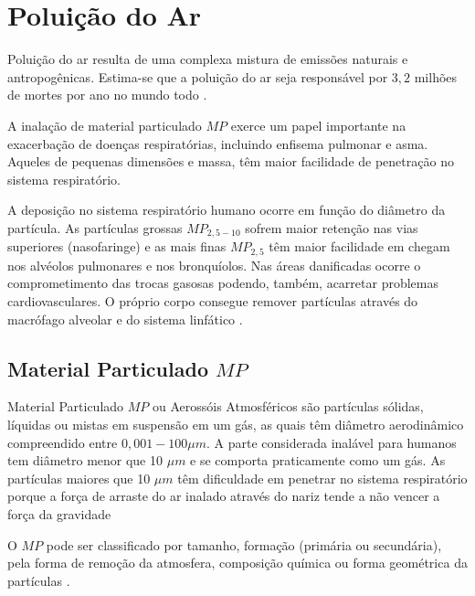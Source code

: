 \section{Poluição do Ar}

Poluição do ar resulta de uma complexa mistura de emissões naturais e 
antropogênicas. Estima-se que a poluição do ar seja responsável por 
$3,2$ milhões de mortes por ano no mundo todo \citep{lim2013}.%

A inalação de material particulado $MP$ exerce um papel importante na 
exacerbação de doenças respiratórias, incluindo enfisema pulmonar e asma. 
Aqueles de pequenas dimensões e massa, têm maior facilidade de penetração no sistema 
respiratório. 

A deposição no sistema respiratório humano ocorre em função do diâmetro da 
partícula.
As partículas grossas $MP_{2,5-10}$ sofrem maior retenção nas vias superiores (nasofaringe) e
as mais finas $MP_{2,5}$ têm maior facilidade em chegam nos alvéolos pulmonares e 
nos bronquíolos.
Nas áreas danificadas ocorre o comprometimento das trocas gasosas podendo, 
também, acarretar problemas cardiovasculares.
O próprio corpo consegue remover partículas através do macrófago alveolar 
e do sistema linfático \citep{arbex2012}.


\subsection{Material Particulado $MP$}

Material Particulado $MP$ ou Aerossóis Atmosféricos são partículas
sólidas, líquidas ou mistas em suspensão em um gás, as quais têm diâmetro 
aerodinâmico compreendido  entre $0,001-100\mu m$. 
A parte considerada inalável para humanos tem diâmetro menor que 10 $\mu m$
e se comporta praticamente como um gás.
As partículas maiores que 10 $\mu m$ têm dificuldade em penetrar 
no sistema respiratório porque a força de arraste do ar inalado 
através do nariz tende a não vencer a força da gravidade \citep{seinfeld2012}


O $MP$ pode ser classificado por tamanho, formação 
(primária ou secundária), pela forma de remoção da atmosfera, 
composição química ou forma geométrica da partículas \citep{seinfeld2012}.%

